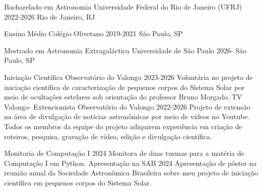 \documentclass[11pt]{spidercv}
\begin{document}
    





    \begin{MainPart}

    \Experience
        {\ColorHighlight}
		{Bacharelado em Astronomia}
		{Universidade Federal do Rio de Janeiro (UFRJ)}
        {2022-2026}
        {   
            Rio de Janeiro, RJ\\
        
        }
   
    \Experience
        {\ColorHighlight}
		{Ensino Médio}
		{Colégio Olivetano}
        {2019-2021}
        {   
            São Paulo, SP\\

        }

    \Experience
        {\ColorHighlight}
		{Mestrado em Astronomia Extragaláctica}
		{Universidade de São Paulo}
        {2026-\faUndo}
        {   
            São Paulo, SP\\
        }
        \vspace*{0.7cm}

    \Experience
        {\ColorHighlight}
		{Iniciação Científica}
		{Observatório do Valongo}
        {2023-2026}
        {Voluntária no projeto de iniciação científica de caracterização de pequenos corpos do Sistema Solar por meio de ocultações estelares sob orientação do professor Bruno Morgado.}
        \vspace*{0.1cm}
    \Experience
        {\ColorHighlight}
		{TV Valongo- Extencionista}
		{Observatório do Valongo}
        {2022-2026}
        {Projeto de extensão na área de divulgação de notícias astronômicas por meio de vídeos no Youtube. Todos os membros da equipe do projeto adiquirem experiência em criação de roteiros, pesquisa, gravação de vídeo, edição e divulgação científica.}

        \vspace*{0.1cm}
    \Experience
        {\ColorHighlight}
		{Monitoria de Computação I}
		{}
        {2024}
        {Monitora de duas turmas para a matéria de Computação I em Python.}
        \vspace*{0.1cm}
    \Experience
        {\ColorHighlight}
		{Apresentação na SAB}
		{}
        {2024}
        {Apresentação de pôster na reunião anual da Sociedade Astronômica Brasileira sobre meu projeto de iniciação científica em pequenos corpos do Sistema Solar.}

    \end{MainPart}


    


    
\end{document}
